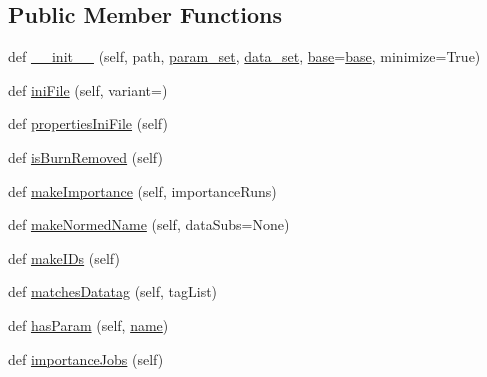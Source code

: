 \subsection*{Public Member Functions}
\begin{DoxyCompactItemize}
\item 
def \mbox{\hyperlink{classparamgrid_1_1batchjob_1_1jobItem_ac0d59c15a23577cc2d2ae0e691dc780f}{\+\_\+\+\_\+init\+\_\+\+\_\+}} (self, path, \mbox{\hyperlink{classparamgrid_1_1batchjob_1_1jobItem_a2c53c09570ba09bba3b18313e832100d}{param\+\_\+set}}, \mbox{\hyperlink{classparamgrid_1_1batchjob_1_1jobItem_aa2bda614aa70f79336a2704f0b806cef}{data\+\_\+set}}, \mbox{\hyperlink{classparamgrid_1_1batchjob_1_1jobItem_af453f4de88c699dffaaca5bbff071035}{base}}=\textquotesingle{}\mbox{\hyperlink{classparamgrid_1_1batchjob_1_1jobItem_af453f4de88c699dffaaca5bbff071035}{base}}\textquotesingle{}, minimize=True)
\item 
def \mbox{\hyperlink{classparamgrid_1_1batchjob_1_1jobItem_a5a3a41b8f0daafd574c2f88d909a1f10}{ini\+File}} (self, variant=\textquotesingle{}\textquotesingle{})
\item 
def \mbox{\hyperlink{classparamgrid_1_1batchjob_1_1jobItem_abedf1639a7b1212c030844b523747d0c}{properties\+Ini\+File}} (self)
\item 
def \mbox{\hyperlink{classparamgrid_1_1batchjob_1_1jobItem_a935f89613b4c83962de849b6124f4626}{is\+Burn\+Removed}} (self)
\item 
def \mbox{\hyperlink{classparamgrid_1_1batchjob_1_1jobItem_afca4f33b01300cd113f3ec9206d61da6}{make\+Importance}} (self, importance\+Runs)
\item 
def \mbox{\hyperlink{classparamgrid_1_1batchjob_1_1jobItem_a00fa8cb2fb3cfd794d9ec31cc44a0e2d}{make\+Normed\+Name}} (self, data\+Subs=None)
\item 
def \mbox{\hyperlink{classparamgrid_1_1batchjob_1_1jobItem_a21a745131f1ba6ee8361c6955bedcda0}{make\+I\+Ds}} (self)
\item 
def \mbox{\hyperlink{classparamgrid_1_1batchjob_1_1jobItem_a6d38d60909397622e79b25f7a4f9ebd3}{matches\+Datatag}} (self, tag\+List)
\item 
def \mbox{\hyperlink{classparamgrid_1_1batchjob_1_1jobItem_ad4e818970f5aaee317480ad927afe583}{has\+Param}} (self, \mbox{\hyperlink{classparamgrid_1_1batchjob_1_1jobItem_ab747468d6fae17c7bc300b882f9ddc8a}{name}})
\item 
def \mbox{\hyperlink{classparamgrid_1_1batchjob_1_1jobItem_aa515c3a39c340bcefa63c30e564ad24d}{importance\+Jobs}} (self)
\item 

\end{DoxyCompactItemize}
